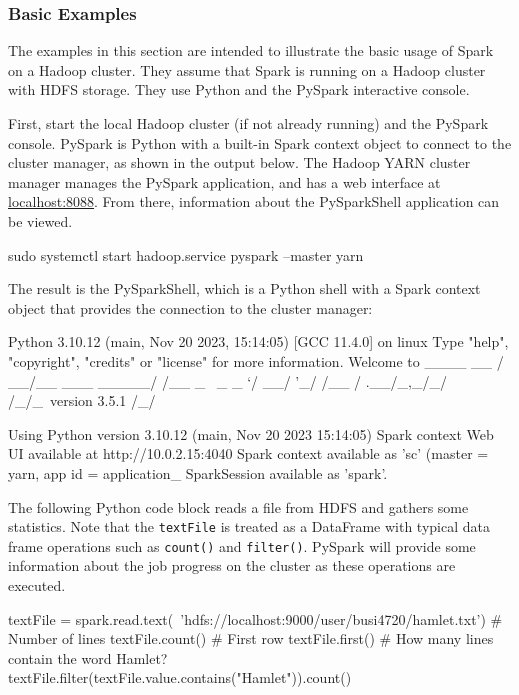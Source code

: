 \begin{withcode}
\subsubsection*{Basic Examples}

The examples in this section are intended to illustrate the basic usage of Spark on a Hadoop cluster. They assume that Spark is running on a Hadoop cluster with HDFS storage. They use Python and the PySpark interactive console.

First, start the local Hadoop cluster (if not already running) and the PySpark console. PySpark is Python with a built-in Spark context object to connect to the cluster manager, as shown in the output below. The Hadoop YARN cluster manager manages the PySpark application, and has a web interface at \url{localhost:8088}. From there, information about the PySparkShell application can be viewed.

\begin{bashcode}
sudo systemctl start hadoop.service
pyspark --master yarn
\end{bashcode}

The result is the PySparkShell, which is a Python shell with a Spark context object that provides the connection to the cluster manager:

\begin{textcode}
Python 3.10.12 (main, Nov 20 2023, 15:14:05) [GCC 11.4.0] on linux
Type "help", "copyright", "credits" or "license" for more information.
Welcome to
      ____              __
     / __/__  ___ _____/ /__
    _\ \/ _ \/ _ `/ __/  '_/
   /__ / .__/\_,_/_/ /_/\_\   version 3.5.1
      /_/

Using Python version 3.10.12 (main, Nov 20 2023 15:14:05)
Spark context Web UI available at http://10.0.2.15:4040
Spark context available as 'sc' (master = yarn, app id = application_
SparkSession available as 'spark'.
\end{textcode}

The following Python code block reads a file from HDFS and gathers some statistics. Note that the \texttt{textFile} is treated as a DataFrame with typical data frame operations such as \texttt{count()} and \texttt{filter()}. PySpark will provide some information about the job progress on the cluster as these operations are executed.

\begin{pythoncode}
textFile = spark.read.text(\
    'hdfs://localhost:9000/user/busi4720/hamlet.txt')
# Number of lines
textFile.count() 
# First row
textFile.first()
# How many lines contain the word Hamlet?
textFile.filter(textFile.value.contains("Hamlet")).count() 
\end{pythoncode}


\end{withcode}
